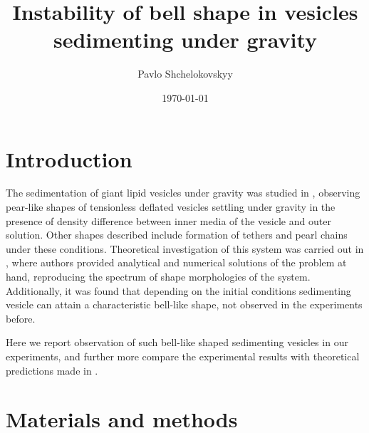 \documentclass[10pt,a4paper]{article}
\begin{document}
\author{Pavlo Shchelokovskyy}
\title{Instability of bell shape in vesicles sedimenting under gravity}
\date{\today}
\maketitle


\section{Introduction}\label{intro}
The sedimentation of giant lipid vesicles under gravity was studied in \cite{Huang2011}, observing pear-like shapes of tensionless deflated vesicles settling under gravity in the presence of density difference between inner media of the vesicle and outer solution.
Other shapes described include formation of tethers and pearl chains under these conditions.
Theoretical investigation of this system was carried out in \cite{Boedec2012}, where authors provided analytical and numerical solutions of the problem at hand, reproducing the spectrum of shape morphologies of the system.
Additionally, it was found that depending on the initial conditions sedimenting vesicle can attain a characteristic bell-like shape, not observed in the experiments before.

Here we report observation of such bell-like shaped sedimenting vesicles in our experiments, and further more compare the experimental results with theoretical predictions made in \cite{Boedec2012}.

\section{Materials and methods}\label{methods}
\end{document}
